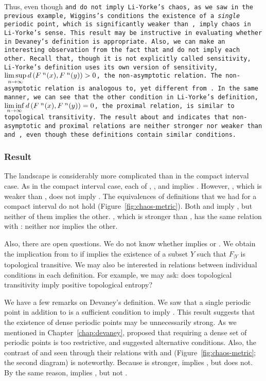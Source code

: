 \documentclass[10pt,twoside,draft]{book}
\begin{document}
Thus, even though \tt and \sdic do not imply Li-Yorke's chaos, as we saw in the previous example, Wiggins's conditions the existence of a \textit{single} periodic point, which is significantly weaker than \dpp, imply chaos in Li-Yorke's sense.
This result may be instructive in evaluating whether \dpp in Devaney's definition is appropriate.
Also, we can make an interesting observation from the fact that \wig and \liy do not imply each other. 
Recall that, though it is not explicitly called sensitivity, Li-Yorke's definition uses its own version of sensitivity, $\limsup\limits_{n\to \infty} d\left( F^{\;n}(x), F^{\;n}(y) \right) > 0$, the non-asymptotic relation.
The non-asymptotic relation is analogous to, yet different from \sdic.
In the same manner, we can see that the other condition in Li-Yorke's definition, $\liminf\limits_{n\to \infty} d\left( F^{\;n}(x), F^{\;n}(y) \right) = 0$, the proximal relation, is similar to topological transitivity.
The result about \wig and \liy indicates that non-asymptotic and proximal relations are neither stronger nor weaker than \tt and \sdic, even though these definitions contain similar conditions.

\subsubsection*{Result}
The landscape is considerably more complicated than in the compact interval case.
As in the compact interval case, each of \dev, \blcp, and \akm implies \liy.
However, \wig, which is weaker than \dev, does not imply \liy.
The equivalences of definitions that we had for a compact interval do not hold (Figure~\ref{fig:chaos-metric}).
Both \dev and \akm imply \liy, but neither of them implies the other.
\blcp, which is stronger than \akm, has the same relation with \dev: neither \blcp nor \akm implies the other.

Also, there are open questions.
We do not know whether \akm implies \blcp or \wig.
We obtain the implication from \akm to \wig if \akm implies the existence of a subset $Y$ such that $F_{|Y}$ is topological transitive.
We may also be interested in relations between individual conditions in each definition.
For example, we may ask: does topological transitivity imply positive topological entropy?

We have a few remarks on Devaney's definition.
We saw that a single periodic point in addition to \wig is a sufficient condition to imply \liy. 
This result suggests that the existence of dense periodic points may be unnecessarily strong.
As we mentioned in Chapter~\ref{chap:devaney}, \citet{glasner} proposed that requiring a dense set of periodic points is too restrictive, and suggested alternative conditions.
Also, the contrast of \dev and \wig seen through their relations with \akm and \liy (Figure~\ref{fig:chaos-metric}; the second diagram) is noteworthy.
Because \dev is stronger, \dev implies \liy, but \wig does not.
By the same reason, \blcp implies \wig, but not \dev.
\end{document}
